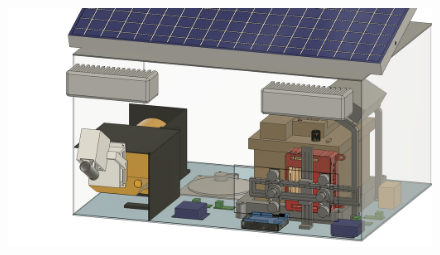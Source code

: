 \begin{figure}
    \centering
    \includegraphics[width=\textwidth]{images/whole_box.png}
    \label{fig:whole_thing}
\end{figure}
